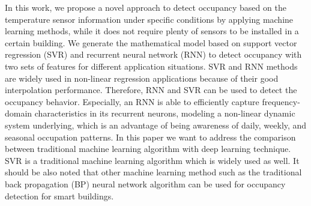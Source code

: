 In this work, we propose a novel approach to detect occupancy based on the
temperature sensor information under specific conditions by applying machine
learning methods, while it does not require plenty of sensors to be installed
in a certain building.  We generate the mathematical model based on support
vector regression (SVR) and recurrent neural network (RNN) to detect occupancy
with two sets of features for different application situations. \textcolor{feb18rev}{SVR and RNN methods are widely used in non-linear regression applications because of their good interpolation performance. Therefore, RNN and SVR can be used to detect the occupancy behavior. Especially, an RNN is able to efficiently capture frequency-domain characteristics in its recurrent neurons, modeling a non-linear dynamic system underlying, which is an advantage of being awareness of daily, weekly, and seasonal occupation patterns. In this paper we want to address the comparison between traditional machine learning algorithm with deep learning technique. SVR is a traditional machine learning algorithm which is widely used as well. It should be also noted that other machine learning method such as the traditional back propagation (BP) neural network algorithm can be used for occupancy detection for smart buildings.} 

